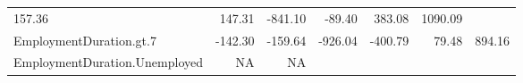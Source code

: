 \documentclass[]{article}
\begin{document}
\begin{longtable}[]{@{}lrrrrrr@{}}
\begin{minipage}[t]{0.10\columnwidth}
157.36\strut
\end{minipage} & \begin{minipage}[t]{0.08\columnwidth}\raggedleft\strut
147.31\strut
\end{minipage} & \begin{minipage}[t]{0.08\columnwidth}\raggedleft\strut
-841.10\strut
\end{minipage} & \begin{minipage}[t]{0.08\columnwidth}\raggedleft\strut
-89.40\strut
\end{minipage} & \begin{minipage}[t]{0.08\columnwidth}\raggedleft\strut
383.08\strut
\end{minipage} & \begin{minipage}[t]{0.08\columnwidth}\raggedleft\strut
1090.09\strut
\end{minipage}\tabularnewline
\begin{minipage}[t]{0.31\columnwidth}\raggedright\strut
EmploymentDuration.gt.7\strut
\end{minipage} & \begin{minipage}[t]{0.10\columnwidth}\raggedleft\strut
-142.30\strut
\end{minipage} & \begin{minipage}[t]{0.08\columnwidth}\raggedleft\strut
-159.64\strut
\end{minipage} & \begin{minipage}[t]{0.08\columnwidth}\raggedleft\strut
-926.04\strut
\end{minipage} & \begin{minipage}[t]{0.08\columnwidth}\raggedleft\strut
-400.79\strut
\end{minipage} & \begin{minipage}[t]{0.08\columnwidth}\raggedleft\strut
79.48\strut
\end{minipage} & \begin{minipage}[t]{0.08\columnwidth}\raggedleft\strut
894.16\strut
\end{minipage}\tabularnewline
\begin{minipage}[t]{0.31\columnwidth}\raggedright\strut
EmploymentDuration.Unemployed\strut
\end{minipage} & \begin{minipage}[t]{0.10\columnwidth}\raggedleft\strut
NA\strut
\end{minipage} & \begin{minipage}[t]{0.08\columnwidth}\raggedleft\strut
NA\strut
\end{minipage} & \begin{minipage}[t]{0.08\columnwidth}\raggedleft\strut

\end{minipage}
\end{longtable}
\end{document}
